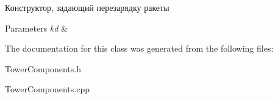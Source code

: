 Конструктор, задающий перезарядку ракеты 


\begin{DoxyParams}{Parameters}
{\em kd} & \\
\hline
\end{DoxyParams}


The documentation for this class was generated from the following files\+:\begin{DoxyCompactItemize}
\item 
Tower\+Components.\+h\item 
Tower\+Components.\+cpp\end{DoxyCompactItemize}
